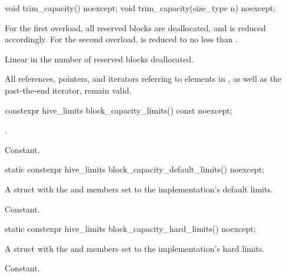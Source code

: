 %
\begin{itemdecl}
void trim_capacity() noexcept;
void trim_capacity(size_type n) noexcept;
\end{itemdecl}

\begin{itemdescr}
\pnum
\effects
For the first overload, all reserved blocks are deallocated, and
 is reduced accordingly.
For the second overload,  is reduced to no less than .

\pnum
\complexity
Linear in the number of reserved blocks deallocated.

\pnum
\remarks
All references, pointers, and iterators referring to elements in ,
as well as the past-the-end iterator, remain valid.
\end{itemdescr}

%
\begin{itemdecl}
constexpr hive_limits block_capacity_limits() const noexcept;
\end{itemdecl}

\begin{itemdescr}
\pnum
\returns
{}.

\pnum
\complexity
Constant.
\end{itemdescr}

%
\begin{itemdecl}
static constexpr hive_limits block_capacity_default_limits() noexcept;
\end{itemdecl}

\begin{itemdescr}
\pnum
\returns
A  struct
with the  and  members set to
the implementation's default limits.

\pnum
\complexity
Constant.
\end{itemdescr}

%
\begin{itemdecl}
static constexpr hive_limits block_capacity_hard_limits() noexcept;
\end{itemdecl}

\begin{itemdescr}
\pnum
\returns
A  struct
with the  and  members set to
the implementation's hard limits.

\pnum
\complexity
Constant.
\end{itemdescr}

